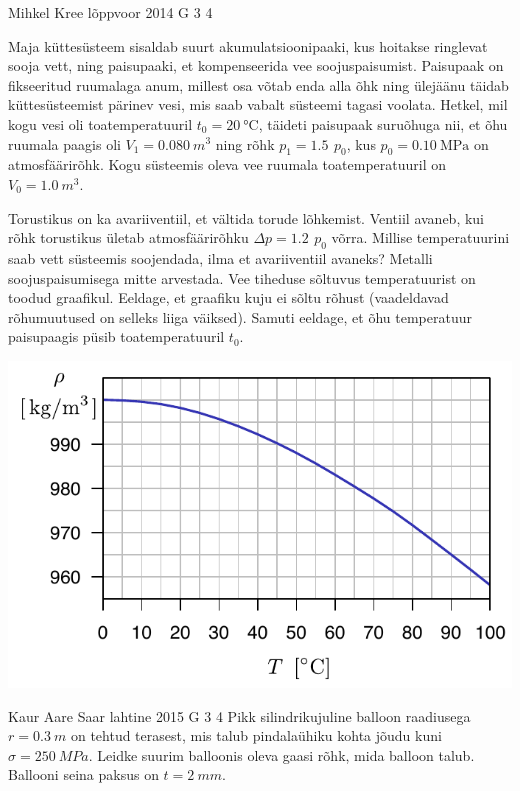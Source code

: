 \documentclass[11pt]{article}
\begin{document}
{%
{Mihkel Kree} %
{lõppvoor} %
{2014} %
{G 3} %
{4} %
{
\ifStatement
Maja küttesüsteem sisaldab suurt akumulatsioonipaaki, kus hoitakse ringlevat sooja vett, ning paisupaaki, et kompenseerida vee soojuspaisumist. Paisupaak on fikseeritud ruumalaga anum, millest osa võtab enda alla õhk ning ülejäänu täidab küttesüsteemist pärinev vesi, mis saab vabalt süsteemi tagasi voolata. Hetkel, mil kogu vesi oli toatemperatuuril $t_0=\SI{20}{\celsius}$, täideti paisupaak suruõhuga nii, et õhu ruumala paagis oli $V_1=\SI{0.080}{m^3}$ ning rõhk $p_1=\SI{1.5}{}\,p_0$, kus $p_0=\SI{0.10}{\mega\pascal}$ on atmosfäärirõhk. Kogu süsteemis oleva vee ruumala toatemperatuuril on $V_0=\SI{1.0}{m^3}$.

Torustikus on ka avariiventiil, et vältida torude lõhkemist. Ventiil avaneb, kui rõhk torustikus ületab atmosfäärirõhku $\Delta p = \SI{1.2}{} \, p_0 $ võrra. Millise temperatuurini saab vett süsteemis soojendada, ilma et avariiventiil avaneks? Metalli soojuspaisumisega mitte arvestada. Vee tiheduse sõltuvus temperatuurist on toodud graafikul. Eeldage, et graafiku kuju ei sõltu rõhust (vaadeldavad rõhumuutused on selleks liiga väiksed). Samuti eeldage, et õhu temperatuur paisupaagis püsib toatemperatuuril $t_0$.

\begin{center}
\includegraphics[width=0.8\linewidth]{2014-v3g-03-veeTihedus}
\end{center}
\fi
}

{Kaur Aare Saar} %
{lahtine} %
{2015} %
{G 3} %
{4} %
{
\ifStatement
Pikk silindrikujuline balloon raadiusega $r=\SI{0,3}{m}$ on tehtud terasest, mis talub pindalaühiku kohta jõudu kuni $\sigma=\SI{250}{MPa}$. Leidke suurim balloonis oleva gaasi rõhk, mida balloon talub. Ballooni seina paksus on $t=\SI{2}{mm}$.
\fi
}

}
\end{document}
